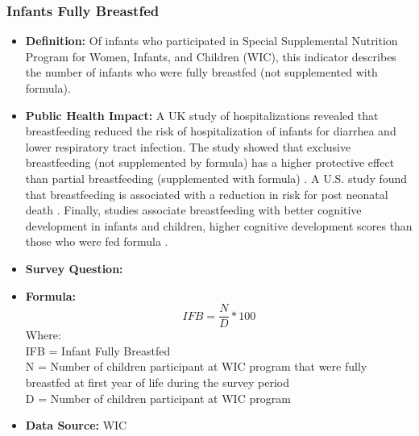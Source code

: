 \documentclass[12pt,letterpaper]{report}
\begin{document}
\subsubsection{Infants Fully Breastfed}
\begin{itemize}
		\item \textbf{Definition:} Of infants who participated in Special Supplemental Nutrition Program for Women, Infants, and Children (WIC), this indicator describes the number of infants who were fully breastfed (not supplemented with formula).
		\item \textbf{Public Health Impact:} A UK study of hospitalizations revealed that breastfeeding reduced the risk of hospitalization of infants for diarrhea and lower respiratory tract infection. The study showed that exclusive breastfeeding (not supplemented by formula) has a higher protective effect than partial breastfeeding (supplemented with formula) \cite{quigley2007breastfeeding}. A U.S. study found that breastfeeding is associated with a reduction in risk for post neonatal death \cite{chen2004breastfeeding}. Finally, studies associate breastfeeding with better cognitive development in infants and children, higher cognitive development scores than those who were fed formula \cite{anderson1999breast}. 
		\item \textbf{Survey Question:}
		\item \textbf{Formula:} 
			\begin{equation}
				IFB = \frac{N}{D} *100
			\end{equation}
Where: \\
			IFB = Infant Fully Breastfed \\
			
			N = Number of children participant at WIC program that were fully breastfed at first year of life during the survey period\\
			
			D = Number of children participant at WIC program \\
			
			
		\item \textbf{Data Source:} WIC
	\end{itemize}
\end{document}
